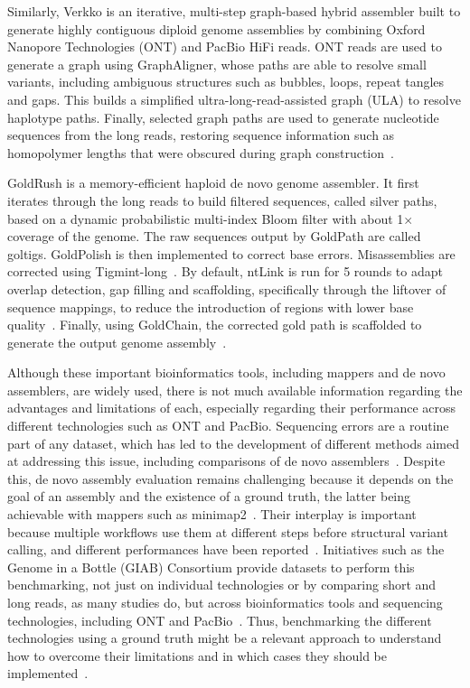\documentclass[12pt, letterpaper]{article}
\begin{document}
Similarly, Verkko is an iterative, multi-step graph-based hybrid assembler built to generate highly contiguous diploid genome assemblies by combining Oxford Nanopore Technologies (ONT) and PacBio HiFi reads. ONT reads are used to generate a graph using GraphAligner, whose paths are able to resolve small variants, including ambiguous structures such as bubbles, loops, repeat tangles and gaps. This builds a simplified ultra-long-read-assisted graph (ULA) to resolve haplotype paths. Finally, selected graph paths are used to generate nucleotide sequences from the long reads, restoring sequence information such as homopolymer lengths that were obscured during graph construction~\cite{Rautiainen2023,Bankevich2022}.

GoldRush is a memory-efficient haploid de novo genome assembler. It first iterates through the long reads to build filtered sequences, called silver paths, based on a dynamic probabilistic multi-index Bloom filter with about 1$\times$ coverage of the genome. The raw sequences output by GoldPath are called goltigs. GoldPolish is then implemented to correct base errors. Misassemblies are corrected using Tigmint-long~\cite{Wong2023}. By default, ntLink is run for 5 rounds to adapt overlap detection, gap filling and scaffolding, specifically through the liftover of sequence mappings, to reduce the introduction of regions with lower base quality~\cite{Wong2023,Wong2022,Zhang2025}. Finally, using GoldChain, the corrected gold path is scaffolded to generate the output genome assembly~\cite{Wong2023,Wong2022}.

Although these important bioinformatics tools, including mappers and de novo assemblers, are widely used, there is not much available information regarding the advantages and limitations of each, especially regarding their performance across different technologies such as ONT and PacBio. Sequencing errors are a routine part of any dataset, which has led to the development of different methods aimed at addressing this issue, including comparisons of de novo assemblers~\cite{Cosma2023}. Despite this, de novo assembly evaluation remains challenging because it depends on the goal of an assembly and the existence of a ground truth, the latter being achievable with mappers such as minimap2~\cite{Cosma2023}. Their interplay is important because multiple workflows use them at different steps before structural variant calling, and different performances have been reported~\cite{Helal2024,Wang2026}. Initiatives such as the Genome in a Bottle (GIAB) Consortium provide datasets to perform this benchmarking, not just on individual technologies or by comparing short and long reads, as many studies do, but across bioinformatics tools and sequencing technologies, including ONT and PacBio~\cite{Munoz2025}. Thus, benchmarking the different technologies using a ground truth might be a relevant approach to understand how to overcome their limitations and in which cases they should be implemented~\cite{vacmap2025,Cosma2023}.
\end{document}
